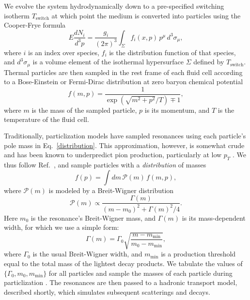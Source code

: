 \documentclass[aps,prc,reprint,amsmath,nofootinbib]{revtex4-1}
\newcommand{\Tsw}{T_\text{switch}}
\begin{document}
We evolve the system hydrodynamically down to a pre-specified switching isotherm $\Tsw$ at which point the medium is converted into particles using the Cooper-Frye formula \cite{PhysRevD.10.186}
\begin{equation}
  \label{cooper-frye}
  E \frac{dN_i}{d^3p} = \frac{g_i}{(2\pi)^3} \int_\Sigma f_i(x, p)\, p^\mu\, d^3\sigma_\mu,
\end{equation}
where $i$ is an index over species, $f_i$ is the distribution function of that species, and $d^3\sigma_\mu$ is a volume element of the isothermal hypersurface $\Sigma$ defined by $\Tsw$.
Thermal particles are then sampled in the rest frame of each fluid cell according to a Bose-Einstein or Fermi-Dirac distribution at zero baryon chemical potential
\begin{equation}
  \label{distribution}
  f(m, p) = \frac{1}{\exp(\sqrt{m^2 + p^2}/T) \mp 1},
\end{equation}
where $m$ is the mass of the sampled particle, $p$ is its momentum, and $T$ is the temperature of the fluid cell.

Traditionally, particlization models have sampled resonances using each particle's pole mass in Eq.~\eqref{distribution}.
This approximation, however, is somewhat crude and has been known to underpredict pion production, particularly at low $p_T$ \cite{Sollfrank:1991xm, Huovinen:2016xxq, Vovchenko:2018fmh}.
We thus follow Ref.~\cite{Bernhard:2018hnz}, and sample particles with a \emph{distribution} of masses
\begin{equation}
  f(p) = \int dm\, \mathcal{P}(m)\, f(m, p),
\end{equation}
where $\mathcal{P}(m)$ is modeled by a Breit-Wigner distribution
\begin{equation}
  \mathcal{P}(m) \propto \frac{\Gamma(m)}{(m - m_0)^2 + \Gamma(m)^2/4}.
\end{equation}
Here $m_0$ is the resonance's Breit-Wigner mass, and $\Gamma(m)$ is its mass-dependent width, for which we use a simple form:
\begin{equation}
  \Gamma(m) = \Gamma_0 \sqrt{\frac{m - m_\mathrm{min}}{m_0 - m_\mathrm{min}}},
\end{equation}
where $\Gamma_0$ is the usual Breit-Wigner width, and $m_\mathrm{min}$ is a production threshold equal to the total mass of the lightest decay products.
We tabulate the values of $\{\Gamma_0, m_0, m_\mathrm{min}\}$ for all particles and sample the masses of each particle during particlization \cite{PDG:2017}.
The resonances are then passed to a hadronic transport model, described shortly, which simulates subsequent scatterings and decays.
\end{document}
